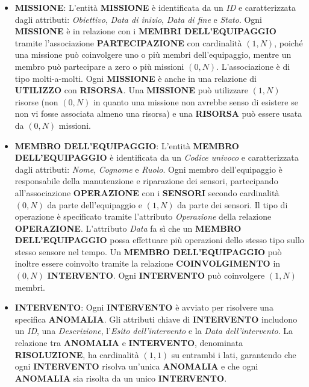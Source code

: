 \begin{itemize}
    \item \textbf{MISSIONE}: L'entità \textbf{MISSIONE} è identificata da un \textit{ID} e caratterizzata dagli attributi: \textit{Obiettivo}, \textit{Data di inizio}, \textit{Data di fine} e \textit{Stato}. Ogni \textbf{MISSIONE} è in relazione con i \textbf{MEMBRI DELL'EQUIPAGGIO} tramite l'associazione \textbf{PARTECIPAZIONE} con cardinalità $(1,N)$, poiché una missione può coinvolgere uno o più membri dell'equipaggio, mentre un membro può partecipare a zero o più missioni $(0,N)$. L'associazione è di tipo molti-a-molti. Ogni \textbf{MISSIONE} è anche in una relazione di \textbf{UTILIZZO} con \textbf{RISORSA}. Una \textbf{MISSIONE} può utilizzare $(1,N)$ risorse (non $(0,N)$ in quanto una missione non avrebbe senso di esistere se non vi fosse associata almeno una risorsa) e una \textbf{RISORSA} può essere usata da $(0,N)$ missioni.
    
    \item \textbf{MEMBRO DELL'EQUIPAGGIO}: L'entità \textbf{MEMBRO DELL'EQUIPAGGIO} è identificata da un \textit{Codice univoco} e caratterizzata dagli attributi: \textit{Nome}, \textit{Cognome} e \textit{Ruolo}. Ogni membro dell'equipaggio è responsabile della manutenzione e riparazione dei sensori, partecipando all'associazione \textbf{OPERAZIONE} con i \textbf{SENSORI} secondo cardinalità $(0,N)$ da parte dell'equipaggio e $(1,N)$ da parte dei sensori. Il tipo di operazione è specificato tramite l'attributo \textit{Operazione} della relazione \textbf{OPERAZIONE}. L'attributo \textit{Data} fa sì che un \textbf{MEMBRO DELL'EQUIPAGGIO} possa effettuare più operazioni dello stesso tipo sullo stesso sensore nel tempo. Un \textbf{MEMBRO DELL'EQUIPAGGIO} può inoltre essere coinvolto tramite la relazione \textbf{COINVOLGIMENTO} in $(0,N)$  \textbf{INTERVENTO}. Ogni \textbf{INTERVENTO} può coinvolgere $(1,N)$ membri.
    
    \item \textbf{INTERVENTO}: Ogni \textbf{INTERVENTO} è avviato per risolvere una specifica \textbf{ANOMALIA}. Gli attributi chiave di \textbf{INTERVENTO} includono un \textit{ID}, una \textit{Descrizione}, l'\textit{Esito dell'intervento} e la \textit{Data dell'intervento}. La relazione tra \textbf{ANOMALIA} e \textbf{INTERVENTO}, denominata \textbf{RISOLUZIONE}, ha cardinalità $(1,1)$ su entrambi i lati, garantendo che ogni \textbf{INTERVENTO} risolva un'unica \textbf{ANOMALIA} e che ogni \textbf{ANOMALIA} sia risolta da un unico \textbf{INTERVENTO}.
    

\end{itemize}
